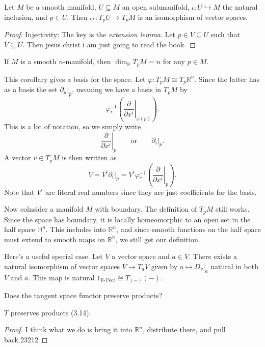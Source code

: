 \begin{proposition}\label{1.2.16}
	Let $M$ be a smooth manifold, $U\subseteq M$ an open submanifold, $\iota : U\hookrightarrow M$ the natural inclusion, and $p\in U$. Then $\iota _* : T_pU \to T_pM$ is an isomorphism of vector spaces.
\end{proposition}
\begin{proof}
	Injectivity: The key is the \emph{extension lemma}. Let $p\in V\subseteq U$ such that $\overline{V} \subseteq U$. Then jesus christ i am just going to read the book.
\end{proof}

\begin{corollary}\label{1.2.17}
	If $M$ is a smooth $n$-manifold, then $\dim _\mathbb{R} T_pM=n$ for any $p\in M$.
\end{corollary}

This corollary gives a basis for the space. Let $\varphi : T_pM \cong T_{\hat{p} } \mathbb{R} ^n$. Since the latter has as a basis the set $\partial _\mu |_{\hat{p} } $, meaning we have a basis in $T_pM$ by
\[
	\varphi _*^{-1} \left( \left.\frac{\partial }{\partial x^i} \right|_{\varphi (p)}  \right) 
.\]
This is a lot of notation, so we simply write
\[
	\left.\frac{\partial }{\partial x^i} \right|_p\qquad\text{or} \qquad \partial _i|_p
.\]
A vector $v\in T_pM$ is then written as
\[
	V=V^i \partial _i|_p = V^i \varphi _*^{-1} \left( \left.\frac{\partial }{\partial x^i} \right|_{p}  \right) 
.\]
Note that $V^i$ are literal real numbers since they are just coefficients for the basis.

Now colnsider a manifold $M$ with boundary. The definition of $T_pM$ still works. Since the space has boundary, it is locally homeomorphic to an open set in the half space $\mathbb{H} ^n$. This includes into $\mathbb{R} ^n$, and since smooth functions on the half space must extend to smooth maps on $\mathbb{R} ^n$, we still get our definition.

Here's a useful special case. Let $V$ a vector space and $a\in V$. There exists a natural isomorphism of vector spaces $V\to T_aV$ given by $a\mapsto D_v|_a$ natural in both $V$ and $a$. This map is natural $1_{\mathbb{R} \text{-} \mathcal{V} \mathrm{ect} } \cong T_{(-)}(-) $.

Does the tangent space functor preserve products?

\begin{proposition}\label{asmd}
	$T$ preserves products (3.14).
\end{proposition}
\begin{proof}
	I think what we do is bring it into $\mathbb{R} ^n$, distribute there, and pull back.23212
\end{proof}

